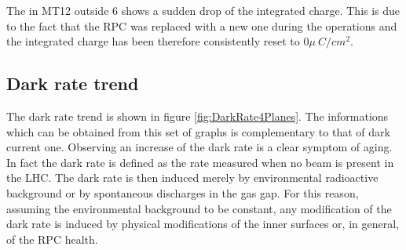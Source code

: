 The in MT12 outside 6 shows a sudden drop of the integrated charge. 
This is due to the fact that the RPC was replaced with a new one during the operations and the integrated charge has been therefore consistently reset to $0\mu~C/cm^2$.

\subsection{Dark rate trend}
The dark rate trend is shown in figure \ref{fig:DarkRate4Planes}.
The informations which can be obtained from this set of graphs is complementary to that of dark current one.
Observing an increase of the dark rate is a clear symptom of aging.
In fact the dark rate is defined as the rate measured when no beam is present in the LHC.
The dark rate is then induced merely by environmental radioactive background or by spontaneous discharges in the gas gap.
For this reason, assuming the environmental background to be constant, any modification of the dark rate is induced by physical modifications of the inner surfaces or, in general, of the RPC health.

